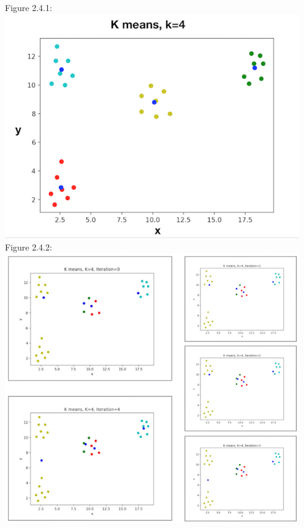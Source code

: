 \documentclass[12pt]{article}
\begin{document}
  \begin{center}
  Figure 2.4.1:\\
  \includegraphics[width=5in]{plots/km_plot1.jpeg}\\

  Figure 2.4.2:\\
  \includegraphics[width=5in]{plots/km_plot2.jpeg}\\


\end{center}
\end{document}
